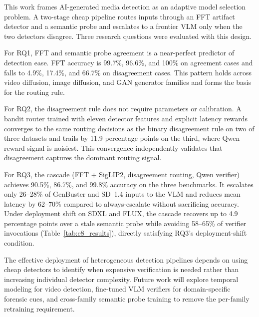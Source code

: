 \documentclass{ieeeaccess}
\begin{document}
This work frames AI-generated media detection as an adaptive model selection problem. A two-stage cheap pipeline routes inputs through an FFT artifact detector and a semantic probe and escalates to a frontier VLM only when the two detectors disagree. Three research questions were evaluated with this design.

For RQ1, FFT and semantic probe agreement is a near-perfect predictor of detection ease. FFT accuracy is 99.7\%, 96.6\%, and 100\% on agreement cases and falls to 4.9\%, 17.4\%, and 66.7\% on disagreement cases. This pattern holds across video diffusion, image diffusion, and GAN generator families and forms the basis for the routing rule.

For RQ2, the disagreement rule does not require parameters or calibration. A bandit router trained with eleven detector features and explicit latency rewards converges to the same routing decisions as the binary disagreement rule on two of three datasets and trails by 11.9 percentage points on the third, where Qwen reward signal is noisiest. This convergence independently validates that disagreement captures the dominant routing signal.

For RQ3, the cascade (FFT + SigLIP2, disagreement routing, Qwen verifier) achieves 90.5\%, 86.7\%, and 99.8\% accuracy on the three benchmarks. It escalates only 26--28\% of GenBuster and SD~1.4 inputs to the VLM and reduces mean latency by 62--70\% compared to always-escalate without sacrificing accuracy. Under deployment shift on SDXL and FLUX, the cascade recovers up to 4.9 percentage
points over a stale semantic probe while avoiding 58--65\% of verifier invocations
(Table~\ref{tab:e8_results}), directly satisfying RQ3's deployment-shift condition.


The effective deployment of heterogeneous detection pipelines depends on using cheap detectors to identify when expensive verification is needed rather than increasing individual detector complexity. Future work will explore temporal modeling for video detection, fine-tuned VLM verifiers for domain-specific forensic cues, and cross-family semantic probe training to remove the per-family retraining requirement.
\end{document}
